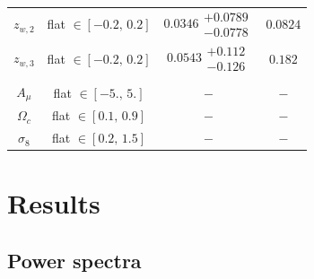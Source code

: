 \documentclass[a4paper,11pt]{article}
\begin{document}
\begin{table}
\begin{center}
\begin{tabular}{cccc}
          $z_{w, 2}$ & flat $\in [-0.2, \,0.2]$ & $0.0346\substack{+0.0789 \\ -0.0778}$ & $0.0824$ \\
          $z_{w, 3}$ & flat $\in [-0.2, \,0.2]$ & $0.0543\substack{+0.112 \\ -0.126}$ & $0.182$ \\ \\
          $A_{\mu}$ & flat $\in [-5., \,5.]$ & $ - $ & $ - $ \\
          $\Omega_{c}$ & flat $\in [0.1, \,0.9]$ & $ - $ & $ - $ \\
          $\sigma_{8}$ & flat $\in [0.2, \,1.5]$ & $ - $ & $ - $ \\
          \hline\hline 
        \end{tabular}
      \end{center}
    \end{table} 

\section{Results}\label{sec:results}
  \subsection{Power spectra}\label{ssec:results.spectra}
\end{document}
